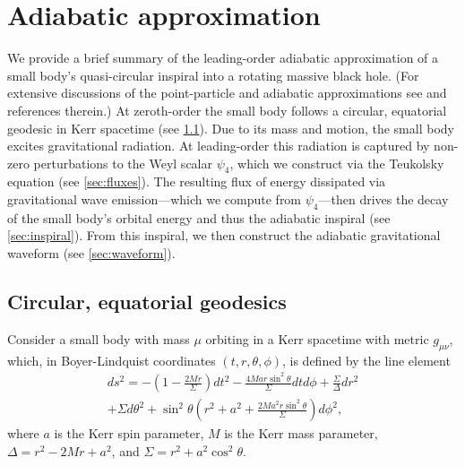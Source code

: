 \documentclass[%
 reprint,
 nofootinbib,
 amsmath,amssymb,
 aps,
 prd,
]{revtex4-2}
\begin{document}
\section{Adiabatic approximation}
\label{sec:adiabatic}

We provide a brief summary of the leading-order adiabatic approximation of a small body's quasi-circular inspiral into a rotating massive black hole. (For extensive discussions of the point-particle and adiabatic approximations see \cite{Hugh00b, Mino03, DrasHugh06, HughETC21} and references therein.) At zeroth-order the small body follows a circular, equatorial geodesic in Kerr spacetime (see \ref{sec:geo}). Due to its mass and motion, the small body excites gravitational radiation. At leading-order this radiation is captured by non-zero perturbations to the Weyl scalar $\psi_4$, which we construct via the Teukolsky equation (see \ref{sec:fluxes}). The resulting flux of energy dissipated via gravitational wave emission---which we compute from $\psi_4$---then drives the decay of the small body's orbital energy and thus the adiabatic inspiral (see \ref{sec:inspiral}). From this inspiral, we then construct the adiabatic gravitational waveform (see \ref{sec:waveform}).

\subsection{Circular, equatorial geodesics}
\label{sec:geo}

Consider a small body with mass $\mu$ orbiting in a Kerr spacetime with metric $g_{\mu\nu}$, which, in Boyer-Lindquist coordinates $(t,r,\theta,\phi)$, is defined by the line element
\begin{multline}
    ds^2 = -\left(1 - \frac{2Mr}{\Sigma} \right) dt^2 - \frac{4Ma r \sin^2\theta}{\Sigma} dtd\phi + \frac{\Sigma}{\Delta} dr^2 
    \\
    + \Sigma d\theta^2 + {\sin^2\theta}\left(r^2+a^2 + \frac{2Ma^2r\sin^2\theta}{\Sigma} \right) d\phi^2,
\end{multline}
where $a$ is the Kerr spin parameter, $M$ is the Kerr mass parameter, $\Delta = r^2 - 2Mr + a^2$, and $\Sigma = r^2+a^2\cos^2\theta$.
\end{document}
